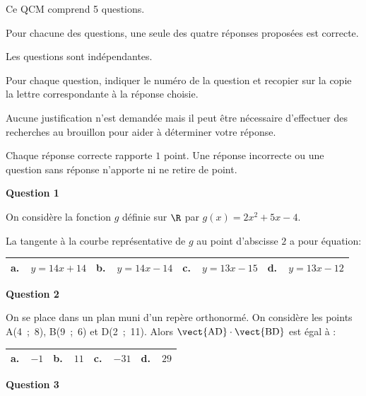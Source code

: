 \medskip

Ce QCM comprend 5 questions.

Pour chacune des questions, une seule des quatre réponses proposées est correcte.

Les questions sont indépendantes.

Pour chaque question, indiquer le numéro de la question et recopier sur la copie la lettre correspondante à la réponse choisie.

Aucune justification n'est demandée mais il peut être nécessaire d'effectuer des recherches au brouillon pour aider à déterminer votre réponse.

Chaque réponse correcte rapporte $1$ point. Une réponse incorrecte ou une question sans réponse n'apporte ni ne retire de point.

\medskip

\textbf{Question 1}

\medskip

On considère la fonction $g$ définie sur $\R$ par $g(x) = 2x^2 + 5x - 4$.

La tangente à la courbe représentative de $g$ au point d'abscisse $2$ a pour équation:

\begin{center}
\begin{tabularx}{\linewidth}{|*{4}{X|}}\hline
\textbf{a.~~}$y = 14x + 14$ &\textbf{b.~~}$y = 14x -14$&\textbf{c.~~}$y = 13x - 15$&\textbf{d.~~}$y = 13x - 12$\\ \hline
\end{tabularx}
\end{center}

\medskip

\textbf{Question 2}

\medskip

On se place dans un plan muni d'un repère orthonormé. On considère les points A(4~;~8), 
B(9~;~6) et D(2~;~11). Alors $\vect{\text{AD}} \cdot \vect{\text{BD}}$ est égal à :

\begin{center}
\begin{tabularx}{\linewidth}{|*{4}{X|}}\hline
\textbf{a.~~}$-1$ &\textbf{b.~~}$11$&\textbf{c.~~}$-31$&\textbf{d.~~}$29$\\ \hline
\end{tabularx}
\end{center}

\medskip

\textbf{Question 3}

\medskip

